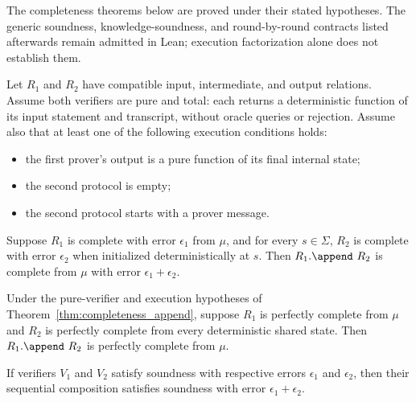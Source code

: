 The completeness theorems below are proved under their stated hypotheses. The generic soundness,
knowledge-soundness, and round-by-round contracts listed afterwards remain admitted in Lean;
execution factorization alone does not establish them.

\begin{theorem}
    \label{thm:completeness_append}
    Let $R_1$ and $R_2$ have compatible input, intermediate, and output relations.
    Assume both verifiers are pure and total: each returns a deterministic function of its input
    statement and transcript, without oracle queries or rejection. Assume also that at least one
    of the following execution conditions holds:
    \begin{itemize}
        \item the first prover's output is a pure function of its final internal state;
        \item the second protocol is empty;
        \item the second protocol starts with a prover message.
    \end{itemize}
    Suppose $R_1$ is complete with error $\epsilon_1$ from $\mu$, and for every $s \in \Sigma$,
    $R_2$ is complete with error $\epsilon_2$ when initialized deterministically at $s$.
    Then $R_1.\append\ R_2$ is complete from $\mu$ with error $\epsilon_1 + \epsilon_2$.
\end{theorem}

\begin{theorem}
    \label{thm:perfect_completeness_append}
    Under the pure-verifier and execution hypotheses of
    Theorem~\ref{thm:completeness_append}, suppose $R_1$ is perfectly complete from $\mu$ and
    $R_2$ is perfectly complete from every deterministic shared state.
    Then $R_1.\append\ R_2$ is perfectly complete from $\mu$.
\end{theorem}

\begin{theorem}
    \label{thm:soundness_append}
    If verifiers $V_1$ and $V_2$ satisfy soundness with respective errors $\epsilon_1$ and $\epsilon_2$, then their sequential composition satisfies soundness with error $\epsilon_1 + \epsilon_2$.
\end{theorem}

